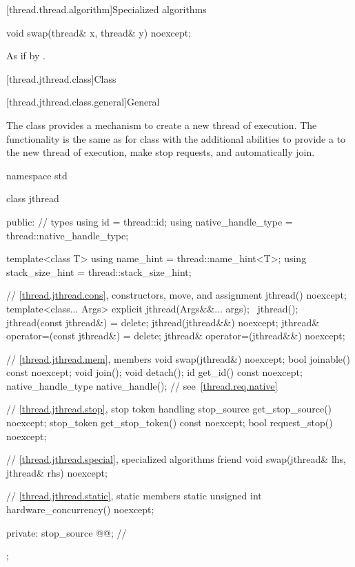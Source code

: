 [thread.thread.algorithm]{Specialized algorithms}

%
\begin{itemdecl}
void swap(thread& x, thread& y) noexcept;
\end{itemdecl}

\begin{itemdescr}
\pnum
\effects
As if by .
\end{itemdescr}

[thread.jthread.class]{Class }

[thread.jthread.class.general]{General}

\pnum
The class  provides a mechanism
to create a new thread of execution.
The functionality is the same as for
class 
with the additional abilities to provide
a  to the new thread of execution,
make stop requests, and automatically join.

%
\begin{codeblock}
namespace std {
  class jthread {
  public:
    // types
    using id = thread::id;
    using native_handle_type = thread::native_handle_type;

    template<class T>
      using name_hint = thread::name_hint<T>;
    using stack_size_hint = thread::stack_size_hint;

    // \ref{thread.jthread.cons}, constructors, move, and assignment
    jthread() noexcept;
    template<class... Args>
      explicit jthread(Args&&... args);
    ~jthread();
    jthread(const jthread&) = delete;
    jthread(jthread&&) noexcept;
    jthread& operator=(const jthread&) = delete;
    jthread& operator=(jthread&&) noexcept;

    // \ref{thread.jthread.mem}, members
    void swap(jthread&) noexcept;
    bool joinable() const noexcept;
    void join();
    void detach();
    id get_id() const noexcept;
    native_handle_type native_handle();                 // see~\ref{thread.req.native}

    // \ref{thread.jthread.stop}, stop token handling
    stop_source get_stop_source() noexcept;
    stop_token get_stop_token() const noexcept;
    bool request_stop() noexcept;

    // \ref{thread.jthread.special}, specialized algorithms
    friend void swap(jthread& lhs, jthread& rhs) noexcept;

    // \ref{thread.jthread.static}, static members
    static unsigned int hardware_concurrency() noexcept;

  private:
    stop_source @@;        // \expos
  };
}
\end{codeblock}

